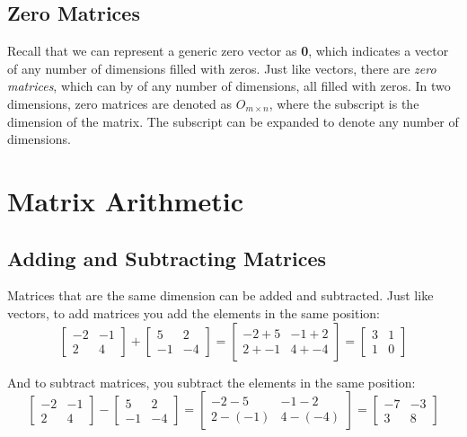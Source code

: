 \subsection{Zero Matrices}
Recall that we can represent a generic zero vector as \textbf{0}, which
indicates a vector of any number of dimensions filled with zeros. Just like
vectors, there are \textit{zero matrices}, which can by of
any number of dimensions, all filled with zeros. In two dimensions, zero
matrices are denoted as $\mathbf{\mathit{O}}_{m \times n}$, where the
subscript is the dimension of the matrix. The subscript can be expanded to
denote any number of dimensions.

\section{Matrix Arithmetic}
\subsection{Adding and Subtracting Matrices}
Matrices that are the same dimension can be added and subtracted. Just like
vectors, to add matrices you add the elements in the same position:
$$\begin{bmatrix}
-2 & -1\\
2 & 4
\end{bmatrix}
+ \begin{bmatrix}
5 & 2\\
-1 & -4
\end{bmatrix}
= \begin{bmatrix}
-2 + 5 & -1 + 2\\
2 + -1 & 4 + -4
\end{bmatrix} =
\begin{bmatrix}
3 & 1\\
1 & 0
\end{bmatrix}$$

And to subtract matrices, you subtract the elements in the same position:
$$\begin{bmatrix}
-2 & -1\\
2 & 4
\end{bmatrix}
- \begin{bmatrix}
5 & 2\\
-1 & -4
\end{bmatrix}
= \begin{bmatrix}
-2 - 5 & -1 - 2\\
2 - (-1) & 4 - (-4)
\end{bmatrix} =
\begin{bmatrix}
-7 & -3\\
3 & 8
\end{bmatrix}$$

